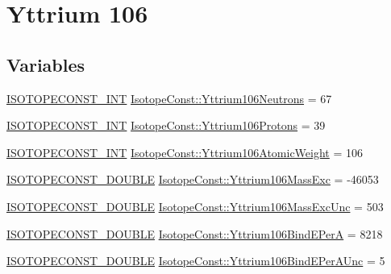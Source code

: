 \hypertarget{group___isotope_const-_yttrium-_y106}{}\section{Yttrium 106}
\label{group___isotope_const-_yttrium-_y106}
\subsection*{Variables}
\begin{DoxyCompactItemize}
\item 
\mbox{\hyperlink{group___isotope_const-_macros_ga5f18360b3e99483a35c32d789e62621c}{I\+S\+O\+T\+O\+P\+E\+C\+O\+N\+S\+T\+\_\+\+I\+NT}} \mbox{\hyperlink{group___isotope_const-_yttrium-_y106_ga95550d82889a9d3f98dafb8ee2664cea}{Isotope\+Const\+::\+Yttrium106\+Neutrons}} = 67
\item 
\mbox{\hyperlink{group___isotope_const-_macros_ga5f18360b3e99483a35c32d789e62621c}{I\+S\+O\+T\+O\+P\+E\+C\+O\+N\+S\+T\+\_\+\+I\+NT}} \mbox{\hyperlink{group___isotope_const-_yttrium-_y106_ga05cc19fd8754b43910334d6cb1b7a0d7}{Isotope\+Const\+::\+Yttrium106\+Protons}} = 39
\item 
\mbox{\hyperlink{group___isotope_const-_macros_ga5f18360b3e99483a35c32d789e62621c}{I\+S\+O\+T\+O\+P\+E\+C\+O\+N\+S\+T\+\_\+\+I\+NT}} \mbox{\hyperlink{group___isotope_const-_yttrium-_y106_ga20c0c02f3dc5037194955cec72939000}{Isotope\+Const\+::\+Yttrium106\+Atomic\+Weight}} = 106
\item 
\mbox{\hyperlink{group___isotope_const-_macros_ga8f45a7272ce02c0b4c65c44636ed719a}{I\+S\+O\+T\+O\+P\+E\+C\+O\+N\+S\+T\+\_\+\+D\+O\+U\+B\+LE}} \mbox{\hyperlink{group___isotope_const-_yttrium-_y106_gae8d3898792dc9829cc01ca949208cb36}{Isotope\+Const\+::\+Yttrium106\+Mass\+Exc}} = -\/46053
\item 
\mbox{\hyperlink{group___isotope_const-_macros_ga8f45a7272ce02c0b4c65c44636ed719a}{I\+S\+O\+T\+O\+P\+E\+C\+O\+N\+S\+T\+\_\+\+D\+O\+U\+B\+LE}} \mbox{\hyperlink{group___isotope_const-_yttrium-_y106_ga20e7aad808b8536e278298c6eaad09f7}{Isotope\+Const\+::\+Yttrium106\+Mass\+Exc\+Unc}} = 503
\item 
\mbox{\hyperlink{group___isotope_const-_macros_ga8f45a7272ce02c0b4c65c44636ed719a}{I\+S\+O\+T\+O\+P\+E\+C\+O\+N\+S\+T\+\_\+\+D\+O\+U\+B\+LE}} \mbox{\hyperlink{group___isotope_const-_yttrium-_y106_ga64a88780b9b54e3208009e124575bc75}{Isotope\+Const\+::\+Yttrium106\+Bind\+E\+PerA}} = 8218
\item 
\mbox{\hyperlink{group___isotope_const-_macros_ga8f45a7272ce02c0b4c65c44636ed719a}{I\+S\+O\+T\+O\+P\+E\+C\+O\+N\+S\+T\+\_\+\+D\+O\+U\+B\+LE}} \mbox{\hyperlink{group___isotope_const-_yttrium-_y106_ga1838aa317c9754774bba93f412acf471}{Isotope\+Const\+::\+Yttrium106\+Bind\+E\+Per\+A\+Unc}} = 5

\end{DoxyCompactItemize}
